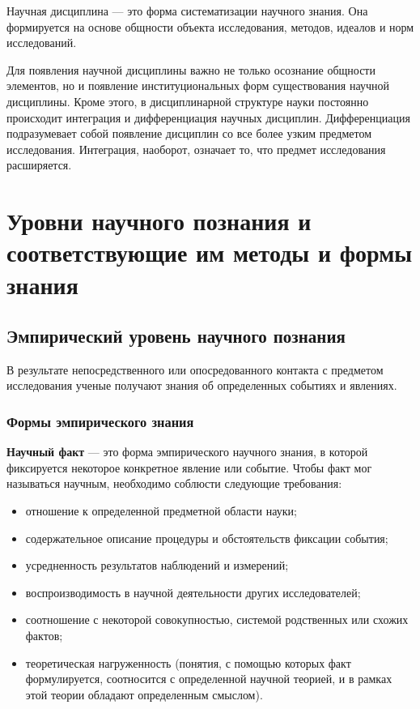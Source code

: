 Научная дисциплина --- это форма систематизации научного знания.
Она формируется на основе общности объекта исследования, методов, идеалов и норм исследований.  

Для появления научной дисциплины важно не только осознание общности
элементов, но и появление институциональных форм существования научной
дисциплины. 
Кроме этого, в дисциплинарной структуре науки постоянно происходит интеграция и
дифференциация научных дисциплин. 
Дифференциация подразумевает собой появление дисциплин со все более узким предметом
исследования. 
Интеграция, наоборот, означает то, что предмет исследования
расширяется.


\section{Уровни научного познания и соответствующие им методы и формы знания}
 
\subsection{Эмпирический уровень научного познания}

В результате непосредственного или опосредованного контакта с
предметом исследования ученые получают знания об определенных событиях и явлениях. 

\subsubsection{Формы эмпирического знания}

\textbf{Научный факт} --- это форма эмпирического научного знания, в которой фиксируется
некоторое конкретное явление или событие. 
Чтобы факт мог называться научным, необходимо соблюсти следующие требования:
\begin{itemize}
    \item отношение к определенной предметной области науки; 
    \item содержательное описание процедуры и  обстоятельств фиксации события;
    \item усредненность результатов наблюдений и измерений; 
    \item воспроизводимость в научной деятельности  других  исследователей;  
    \item соотношение  с  некоторой  совокупностью, системой родственных или схожих фактов;
    \item теоретическая нагруженность (понятия, с помощью
    которых факт формулируется, соотносится с определенной научной теорией, и в
    рамках этой теории обладают определенным смыслом).
\end{itemize}

